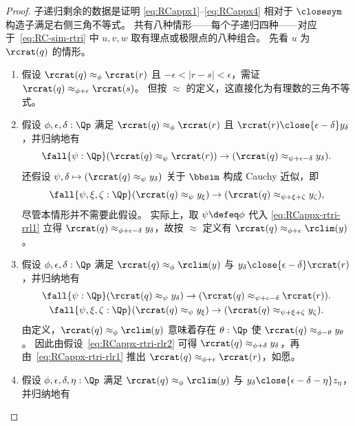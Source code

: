 \begin{proof}
  子递归剩余的数据是证明 \eqref{eq:RCappx1}--\eqref{eq:RCappx4} 相对于 $\closesym$ 构造子满足右侧三角不等式。
  共有八种情形——每个子递归四种——对应于~\eqref{eq:RC-sim-rtri} 中 $u,v,w$ 取有理点或极限点的八种组合。
  先看 $u$ 为 $\rcrat(q)$ 的情形。
  \begin{enumerate}
  \item 假设 $\rcrat(q)\approx_\phi \rcrat(r)$ 且 $-\epsilon<|r-s|<\epsilon$，需证 $\rcrat(q)\approx_{\phi+\epsilon} \rcrat(s)$。
    但按 $\approx$ 的定义，这直接化为有理数的三角不等式。
  \item 假设 $\phi,\epsilon,\delta:\Qp$ 满足 $\rcrat(q)\approx_\phi \rcrat(r)$ 且 $\rcrat(r) \close{\epsilon-\delta} y_\delta$，并归纳地有
    \begin{equation}
      \fall{\psi:\Qp}(\rcrat(q) \approx_{\psi} \rcrat(r)) \to (\rcrat(q) \approx_{\psi+\epsilon-\delta} y_\delta).\label{eq:RCappx-rtri-rrl1}
    \end{equation}
    还假设 $\psi,\delta\mapsto (\rcrat(q) \approx_{\psi} y_\delta)$ 关于 $\bbsim$ 构成 Cauchy 近似，即
    \begin{equation}
      \fall{\psi,\xi,\zeta:\Qp} (\rcrat(q) \approx_{\psi} y_\xi) \to (\rcrat(q) \approx_{\psi+\xi+\zeta} y_\zeta),\label{eq:RCappx-rtri-rrl2}
    \end{equation}
    尽管本情形并不需要此假设。
    实际上，取 $\psi\defeq \phi$ 代入 \eqref{eq:RCappx-rtri-rrl1} 立得 $\rcrat(q) \approx_{\phi+\epsilon-\delta} y_\delta$，故按 $\approx$ 定义有 $\rcrat(q) \approx_{\phi+\epsilon} \rclim(y)$。
  \item 假设 $\phi,\epsilon,\delta:\Qp$ 满足 $\rcrat(q)\approx_\phi \rclim(y)$ 与 $y_\delta \close{\epsilon-\delta} \rcrat(r)$，并归纳地有
    \begin{gather}
      \fall{\psi:\Qp}(\rcrat(q) \approx_{\psi} y_\delta) \to (\rcrat(q) \approx_{\psi+\epsilon-\delta} \rcrat(r)).\label{eq:RCappx-rtri-rlr1}\\
      \fall{\psi,\xi,\zeta:\Qp} (\rcrat(q) \approx_{\psi} y_\xi) \to (\rcrat(q) \approx_{\psi+\xi+\zeta} y_\zeta).\label{eq:RCappx-rtri-rlr2}
    \end{gather}
    由定义，$\rcrat(q)\approx_\phi \rclim(y)$ 意味着存在 $\theta:\Qp$ 使 $\rcrat(q) \approx_{\phi-\theta} y_\theta$。
    因此由假设~\eqref{eq:RCappx-rtri-rlr2} 可得 $\rcrat(q) \approx_{\phi+\delta} y_\delta$，再由~\eqref{eq:RCappx-rtri-rlr1} 推出 $\rcrat(q) \approx_{\phi+\epsilon} \rcrat(r)$，如愿。
  \item 假设 $\phi,\epsilon,\delta,\eta:\Qp$ 满足 $\rcrat(q)\approx_\phi \rclim(y)$ 与 $y_\delta \close{\epsilon-\delta-\eta} z_\eta$，并归纳地有

\end{enumerate}
\end{proof}

